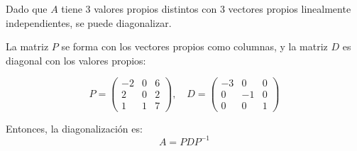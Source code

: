 \documentclass[a4paper]{article}
\begin{document}
\begin{enumerate}
Dado que \(A\) tiene 3 valores propios distintos con 3 vectores propios linealmente independientes, se puede diagonalizar.

La matriz \(P\) se forma con los vectores propios como columnas, y la matriz \(D\) es diagonal con los valores propios:

\[
P = \begin{pmatrix}
-2 & 0 & 6 \\
2 & 0 & 2 \\
1 & 1 & 7
\end{pmatrix}, \quad
D = \begin{pmatrix}
-3 & 0 & 0 \\
0 & -1 & 0 \\
0 & 0 & 1
\end{pmatrix}
\]

Entonces, la diagonalización es:
\[
\boxed{A = P D P^{-1}}
\]
\end{enumerate}
\end{document}
